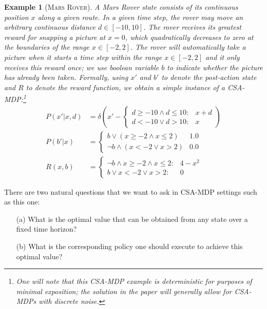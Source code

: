 \documentclass[letterpaper]{article}
\newcommand{\MarsRover}{\textsc{Mars Rover}}
\newtheorem*{example*}{Example}
\begin{document}
\begin{example*}[\MarsRover]
\label{ex:knapsack}
A Mars Rover state consists of its continuous position $x$ along a
given route.  In a given time step, the rover may move an arbitrary
continuous distance $d \in [-10,10]$.  The rover receives its greatest
reward for snapping a picture at $x=0$, which quadratically decreases
to zero at the boundaries of the range $x \in [-2,2]$.  The rover will
automatically take a picture when it starts a time step within the
range $x \in [-2,2]$ and it only receives this reward once; we use
boolean variable $b$ to indicate whether the picture has already been
taken.  Formally, using $x'$ and $b'$ to denote the post-action state
and $R$ to denote the reward function, we obtain a simple instance of
a CSA-MDP:\footnote{One will note that this CSA-MDP example is
deterministic for purposes of minimal exposition; the solution in the
paper will generally allow for CSA-MDPs with discrete noise.}
\begin{align*}
P(x'|x,d) & = \delta \left( x' - \begin{cases}
d \geq -10 \land d \leq 10 : & x + d \\
d < -10 \lor d > 10 : & x
\end{cases}
\right)\\
P(b'|x) & = 
\begin{cases}
b \lor (x \geq -2 \land x \leq 2) & 1.0\\
\neg b \land (x < -2 \lor x > 2)  & 0.0
\end{cases}\\
R(x,b) & = \begin{cases}
\neg b \land x \geq -2 \land x \leq 2 : & 4 - x^2 \\
b \lor x < -2 \lor x > 2 : & 0
\end{cases}
\end{align*}
\end{example*}
There are two natural questions that we want to ask in CSA-MDP settings
such as this one:
\begin{enumerate}
\item[(a)] What is the optimal value that can be obtained from any state 
over a fixed time horizon?
\item[(b)] What is the corresponding policy one should execute to
achieve this optimal value?
\end{enumerate}
\end{document}

